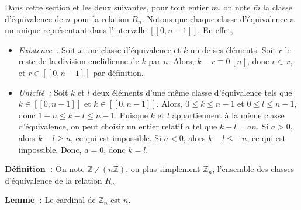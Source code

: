 Dans cette section et les deux suivantes, pour tout entier $m$, on note $\bar{m}$ la classe d'équivalence de $n$ pour la relation $R_n$.
Notons que chaque classe d'équivalence a un unique représentant dans l'intervalle $[\![0, n-1]\!]$. 
En effet,
\begin{itemize}[nosep]
    \item \emph{Existence :} Soit $x$ une classe d'équivalence et $k$ un de ses éléments.
        Soit $r$ le reste de la division euclidienne de $k$ par $n$.
        Alors, $k - r \equiv 0 \, [n]$, donc $r \in x$, et $r \in [\![0, n-1]\!]$ par définition.
    \item \emph{Unicité :} Soit $k$ et $l$ deux éléments d'une même classe d'équivalence tels que $k \in [\![0, n-1]\!]$ et $k \in [\![0, n-1]\!]$.
        Alors, $0 \leq k \leq n-1$ et $0 \leq l \leq n-1$, donc $1-n \leq k - l \leq n-1$.
        Puisque $k$ et $l$ appartiennent à la même classe d'équivalence, on peut choisir un entier relatif $a$ tel que $k - l = a n$.
        Si $a > 0$, alors $k - l \geq n$, ce qui est impossible.
        Si $a < 0$, alors $k - l \leq -n$, ce qui est impossible.
        Donc, $a = 0$, donc $k = l$.
\end{itemize}

\medskip

\noindent\textbf{Définition :} On note $\mathbb{Z} \divslash (n \mathbb{Z})$, ou plus simplement $\mathbb{Z}_n$, l'ensemble des classes d'équivalence de la relation $R_n$.

\medskip

\noindent\textbf{Lemme :} Le cardinal de $\mathbb{Z}_n$ est $n$.

\medskip

